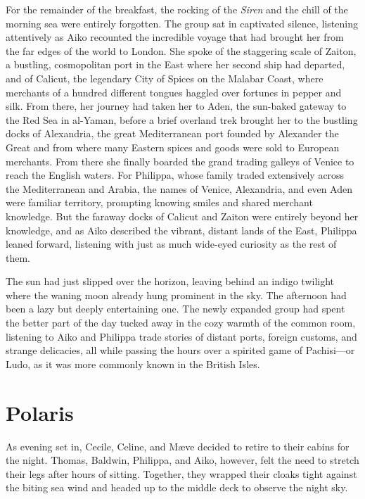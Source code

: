 For the remainder of the breakfast, the rocking of the \textit{Siren} and the chill of the morning sea were entirely forgotten. The group sat in captivated silence, listening attentively as Aiko recounted the incredible voyage that had brought her from the far edges of the world to London. She spoke of the staggering scale of Zaiton, a bustling, cosmopolitan port in the East where her second ship had departed, and of Calicut, the legendary City of Spices on the Malabar Coast, where merchants of a hundred different tongues haggled over fortunes in pepper and silk. From there, her journey had taken her to Aden, the sun-baked gateway to the Red Sea in al-Yaman, before a brief overland trek brought her to the bustling docks of Alexandria, the great Mediterranean port founded by Alexander the Great and from where many Eastern spices and goods were sold to European merchants. From there she finally boarded the grand trading galleys of Venice to reach the English waters. For Philippa, whose family traded extensively across the Mediterranean and Arabia, the names of Venice, Alexandria, and even Aden were familiar territory, prompting knowing smiles and shared merchant knowledge. But the faraway docks of Calicut and Zaiton were entirely beyond her knowledge, and as Aiko described the vibrant, distant lands of the East, Philippa leaned forward, listening with just as much wide-eyed curiosity as the rest of them.

The sun had just slipped over the horizon, leaving behind an indigo twilight where the waning moon already hung prominent in the sky. The afternoon had been a lazy but deeply entertaining one. The newly expanded group had spent the better part of the day tucked away in the cozy warmth of the common room, listening to Aiko and Philippa trade stories of distant ports, foreign customs, and strange delicacies, all while passing the hours over a spirited game of Pachisi---or Ludo, as it was more commonly known in the British Isles.

\section*{Polaris}

As evening set in, Cecile, Celine, and Mæve decided to retire to their cabins for the night. Thomas, Baldwin, Philippa, and Aiko, however, felt the need to stretch their legs after hours of sitting. Together, they wrapped their cloaks tight against the biting sea wind and headed up to the middle deck to observe the night sky.

